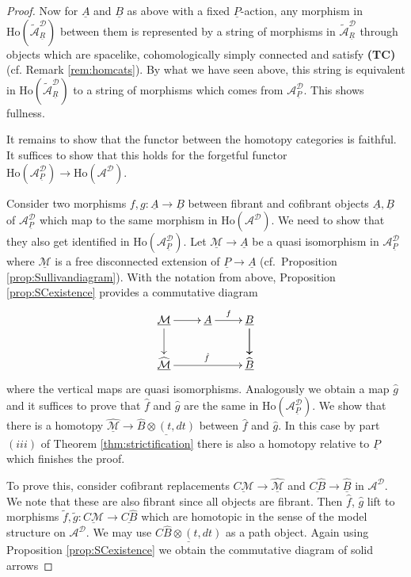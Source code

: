 \documentclass[12pt,a4paper]{article}
\theoremstyle{definition}
\begin{document}
\begin{proof}
Now for $\underline{A}$ and $\underline{B}$ as above with a fixed $\underline{P}$-action, any morphism in $\mathrm{Ho}(\widetilde{\mathcal{A}}^\mathcal{D}_{\underline{R}})$ between them is represented by a string of morphisms in $\widetilde{\mathcal{A}}^\mathcal{D}_{\underline{R}}$ through objects which are spacelike, cohomologically simply connected and satisfy \textbf{(TC)} (cf. Remark \ref{rem:homcats}). By what we have seen above, this string is equivalent in $\mathrm{Ho}(\widetilde{\mathcal{A}}^\mathcal{D}_{\underline{R}})$ to a string of morphisms which comes from ${\mathcal{A}}^\mathcal{D}_{\underline{P}}$. This shows fullness.

It remains to show that the functor between the homotopy categories is faithful. It suffices to show that this holds for the forgetful functor $\mathrm{Ho}(\mathcal{A}^\mathcal{D}_{\underline{P}})\rightarrow \mathrm{Ho}( \mathcal{A}^\mathcal{D})$.


Consider two morphisms $f,g\colon \underline{A}\rightarrow \underline{B}$ between fibrant and cofibrant objects $\underline{A},\underline{B}$ of $\mathcal{A}^\mathcal{D}_{\underline{P}}$ which map to the same morphism in $\mathrm{Ho}(\mathcal{A}^\mathcal{D})$. We need to show that they also get identified in $\mathrm{Ho}(\mathcal{A}^\mathcal{D}_{\underline{P}})$. Let $\underline{\mathcal{M}}\rightarrow \underline{A}$ be a quasi isomorphism in $\mathcal{A}^\mathcal{D}_{\underline{P}}$ where $\underline{\mathcal{M}}$ is a free disconnected extension of $\underline{P}\rightarrow \underline{A}$ (cf.\ Proposition \ref{prop:Sullivandiagram}). With the notation from above, Proposition \ref{prop:SCexistence} provides a commutative diagram
\[\xymatrix{
\underline{\mathcal{M}}\ar[r]\ar[d] & \underline{A}\ar[r]^f & \underline{B}\ar[d]\ar[d]\\
\widehat{\underline{\mathcal{M}}}\ar[rr]^{\hat{f}} & &\widehat{\underline{B}}
}\]
where the vertical maps are quasi isomorphisms. Analogously we obtain a map $\hat{g}$ and it suffices to prove that $\hat{f}$ and $\hat{g}$ are the same in $\mathrm{Ho}(\mathcal{A}^\mathcal{D}_{\underline{P}})$. We show that there is a homotopy $\underline{\widehat{\mathcal{M}}}\rightarrow \underline{\widehat{B}\otimes (t,dt)}$ between $\hat{f}$ and $\hat{g}$. In this case by part $(iii)$ of Theorem \ref{thm:strictification} there is also a homotopy relative to $\underline{P}$ which finishes the proof.

To prove this, consider cofibrant replacements $\underline{C\mathcal{M}}\rightarrow \underline{\widehat{\mathcal{M}}}$ and $\underline{C\widehat{B}}\rightarrow \widehat{\underline{B}}$ in $\mathcal{A}^\mathcal{D}$. We note that these are also fibrant since all objects are fibrant. Then $\hat{f}$, $\hat{g}$ lift to morphisms $\tilde{f},\tilde{g}\colon  \underline{C\mathcal{M}}\rightarrow \underline{C\widehat{B}}$ which are homotopic in the sense of the model structure on $\mathcal{A}^\mathcal{D}$. We may use $\underline{C\widehat{B}\otimes (t,dt)}$ as a path object. Again using Proposition \ref{prop:SCexistence} we obtain the commutative diagram of solid arrows\vspace{0.3cm}


\end{proof}
\end{document}
